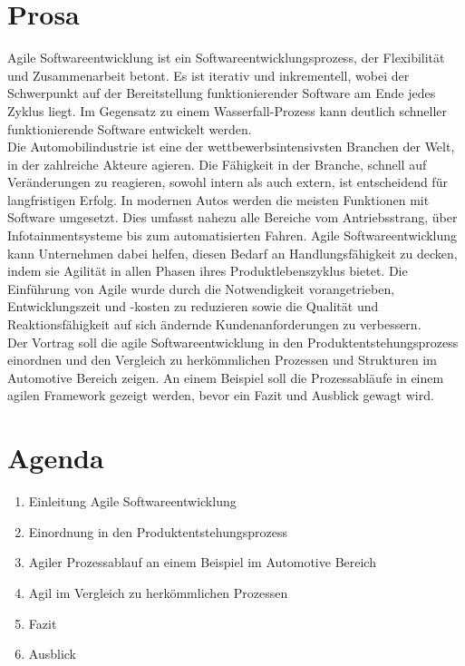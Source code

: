 \section*{Prosa}\label{prosa}
Agile Softwareentwicklung ist ein Softwareentwicklungsprozess, der Flexibilität und Zusammenarbeit betont. Es ist iterativ und inkrementell, wobei der Schwerpunkt auf der Bereitstellung funktionierender Software am Ende jedes Zyklus liegt. Im Gegensatz zu einem Wasserfall-Prozess kann deutlich schneller funktionierende Software entwickelt werden.\\

Die Automobilindustrie ist eine der wettbewerbsintensivsten Branchen der Welt, in der zahlreiche Akteure agieren. Die Fähigkeit in der Branche, schnell auf Veränderungen zu reagieren, sowohl intern als auch extern, ist entscheidend für langfristigen Erfolg. In modernen Autos werden die meisten Funktionen mit Software umgesetzt. Dies umfasst nahezu alle Bereiche vom Antriebsstrang, über Infotainmentsysteme bis zum automatisierten Fahren. Agile Softwareentwicklung kann Unternehmen dabei helfen, diesen Bedarf an Handlungsfähigkeit zu decken, indem sie Agilität in allen Phasen ihres Produktlebenszyklus bietet. Die Einführung von Agile wurde durch die Notwendigkeit vorangetrieben, Entwicklungszeit und -kosten zu reduzieren sowie die Qualität und Reaktionsfähigkeit auf sich ändernde Kundenanforderungen zu verbessern. \cite{Schlosser2016} \cite{katumba2014}\\

Der Vortrag \glqq\titleDocument\grqq{} soll die agile Softwareentwicklung in den Produktentstehungsprozess einordnen und den Vergleich zu herkömmlichen Prozessen und Strukturen im Automotive Bereich zeigen. An einem Beispiel soll die Prozessabläufe in einem agilen Framework gezeigt werden, bevor ein Fazit und Ausblick gewagt wird.\\

\section*{Agenda}
\begin{enumerate}
	\item Einleitung Agile Softwareentwicklung
	\item Einordnung in den Produktentstehungsprozess
	\item Agiler Prozessablauf an einem Beispiel im Automotive Bereich
	\item Agil im Vergleich zu herkömmlichen Prozessen
	\item Fazit
	\item Ausblick
\end{enumerate}